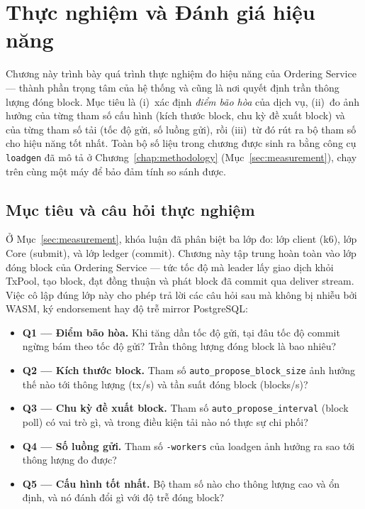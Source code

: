
\chapter{Thực nghiệm và Đánh giá hiệu năng}
\label{chap:evaluation}

Chương này trình bày quá trình thực nghiệm đo hiệu năng của Ordering Service ---
thành phần trọng tâm của hệ thống và cũng là nơi quyết định trần thông lượng đóng
block. Mục tiêu là (i)~xác định \textit{điểm bão hòa} của dịch vụ, (ii)~đo ảnh
hưởng của từng tham số cấu hình (kích thước block, chu kỳ đề xuất block)
và của từng tham số tải (tốc độ gửi, số luồng gửi), rồi (iii)~từ đó rút
ra bộ tham số cho hiệu năng tốt nhất. Toàn bộ số liệu trong chương được sinh ra
bằng công cụ \texttt{loadgen} đã mô tả ở Chương~\ref{chap:methodology}
(Mục~\ref{sec:measurement}), chạy trên cùng một máy để bảo đảm tính so sánh được.

\section{Mục tiêu và câu hỏi thực nghiệm}
\label{sec:eval-goals}

Ở Mục~\ref{sec:measurement}, khóa luận đã phân biệt ba lớp đo: lớp client (k6),
lớp Core (submit), và lớp ledger (commit). Chương này tập trung hoàn toàn vào
lớp đóng block của Ordering Service --- tức tốc độ mà leader lấy giao
dịch khỏi TxPool, tạo block, đạt đồng thuận và phát block đã commit qua deliver
stream. Việc cô lập đúng lớp này cho phép trả lời các câu hỏi sau mà không bị
nhiễu bởi WASM, ký endorsement hay độ trễ mirror PostgreSQL:

\begin{itemize}
  \item \textbf{Q1 --- Điểm bão hòa.} Khi tăng dần tốc độ gửi, tại đâu tốc độ
  commit ngừng bám theo tốc độ gửi? Trần thông lượng đóng block là bao nhiêu?
  \item \textbf{Q2 --- Kích thước block.} Tham số \texttt{auto\_propose\_block\_size}
  ảnh hưởng thế nào tới thông lượng (tx/s) và tần suất đóng block (blocks/s)?
  \item \textbf{Q3 --- Chu kỳ đề xuất block.} Tham số \texttt{auto\_propose\_interval}
  (block poll) có vai trò gì, và trong điều kiện tải nào nó thực sự chi phối?
  \item \textbf{Q4 --- Số luồng gửi.} Tham số \texttt{-workers} của loadgen ảnh
  hưởng ra sao tới thông lượng đo được?
  \item \textbf{Q5 --- Cấu hình tốt nhất.} Bộ tham số nào cho thông lượng cao và
  ổn định, và nó đánh đổi gì với độ trễ đóng block?
\end{itemize}

